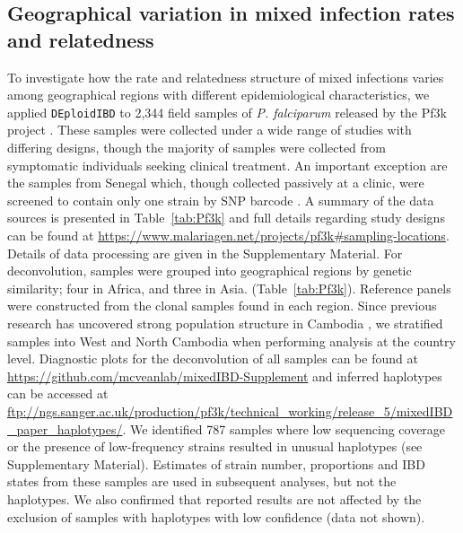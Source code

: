 \documentclass[9pt,lineno]{elife}
\begin{document}
\subsection{Geographical variation in mixed infection rates and relatedness}

To investigate how the rate and relatedness structure of mixed infections varies among geographical regions with different epidemiological characteristics, we applied \texttt{DEploidIBD} to 2,344 field samples of {\it P. falciparum} released by the Pf3k project \citep{pf3k}.  These samples were collected under a wide range of studies with differing designs, though the majority of samples were collected from symptomatic individuals seeking clinical treatment. An important exception are the samples from Senegal which, though collected passively at a clinic, were screened to contain only one strain by SNP barcode \citep{Daniels2015}.  A summary of the data sources is presented in Table~\ref{tab:Pf3k} and full details regarding study designs can be found at \url{https://www.malariagen.net/projects/pf3k#sampling-locations}. Details of data processing are given in the Supplementary Material. For deconvolution, samples were grouped into geographical regions by genetic similarity; four in Africa, and three in Asia. (Table~\ref{tab:Pf3k}). Reference panels were constructed from the clonal samples found in each region. Since previous research has uncovered strong population structure in Cambodia \citep{Miotto2013}, we stratified samples into West and North Cambodia when performing analysis at the country level. Diagnostic plots for the deconvolution of all samples can be found at \url{https://github.com/mcveanlab/mixedIBD-Supplement} and inferred haplotypes can be accessed at \url{ftp://ngs.sanger.ac.uk/production/pf3k/technical_working/release_5/mixedIBD_paper_haplotypes/}. We identified 787 samples where low sequencing coverage or the presence of low-frequency strains resulted in unusual haplotypes (see Supplementary Material). Estimates of strain number, proportions and IBD states from these samples are used in subsequent analyses, but not the haplotypes. We also confirmed that reported results are not affected by the exclusion of samples with haplotypes with low confidence (data not shown).
\end{document}
